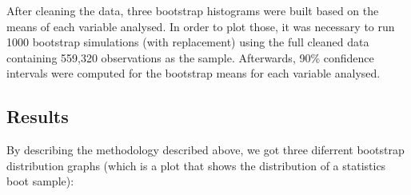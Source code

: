 \documentclass[12pt]{article}
\begin{document}
\noindent
After cleaning the data, three bootstrap histograms were built based on the means of each variable analysed. In order to plot those, it was necessary to run 1000 bootstrap simulations (with replacement) using the full cleaned data containing 559,320 observations as the sample. Afterwards, 90\% confidence intervals were computed for the bootstrap means for each variable analysed.  

\subsection{Results}

By describing the methodology described above, we got three diferrent bootstrap distribution graphs (which is a plot that shows the distribution of a  statistics boot sample):
\end{document}
